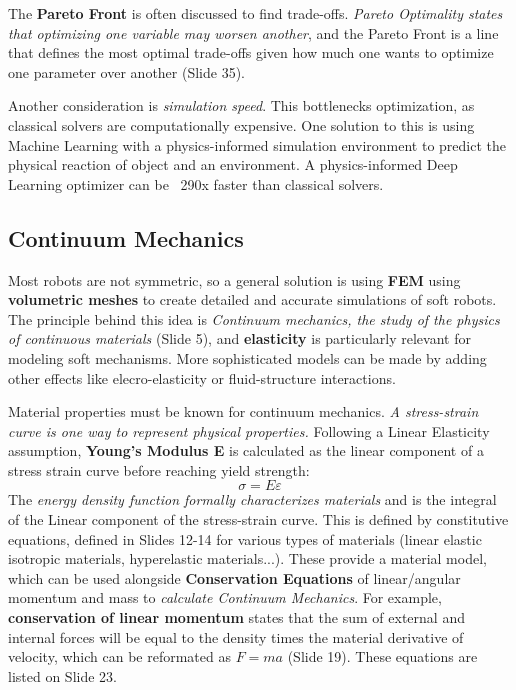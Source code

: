 \documentclass[onecolumn,a4paper]{article}
\begin{document}
The \textbf{Pareto Front} is often discussed to find trade-offs. \emph{Pareto Optimality states that optimizing one variable may worsen another}, and the Pareto Front is a line that defines the most optimal trade-offs given how much one wants to optimize one parameter over another (Slide 35).

Another consideration is \emph{simulation speed}. This bottlenecks optimization, as classical solvers are computationally expensive. One solution to this is using Machine Learning with a physics-informed simulation environment to predict the physical reaction of object and an environment. A physics-informed Deep Learning optimizer can be ~290x faster than classical solvers.

\subsection{Continuum Mechanics}

Most robots are not symmetric, so a general solution is using \textbf{FEM} using \textbf{volumetric meshes} to create detailed and accurate simulations of soft robots. The principle behind this idea is \emph{Continuum mechanics, the study of the physics of continuous materials} (Slide 5), and \textbf{elasticity} is particularly relevant for modeling soft mechanisms. More sophisticated models can be made by adding other effects like elecro-elasticity or fluid-structure interactions.

Material properties must be known for continuum mechanics. \emph{A stress-strain curve is one way to represent physical properties.} Following a Linear Elasticity assumption, \textbf{Young's Modulus E} is calculated as the linear component of a stress strain curve before reaching yield strength:
\begin{equation}
    \sigma=E\varepsilon
\end{equation}
 The \emph{energy density function formally characterizes materials} and is the integral of the Linear component of the stress-strain curve. This is defined by constitutive equations, defined in Slides 12-14 for various types of materials (linear elastic isotropic materials, hyperelastic materials...). These provide a material model, which can be used alongside \textbf{Conservation Equations} of linear/angular momentum and mass  to \emph{calculate Continuum Mechanics}. For example, \textbf{conservation of linear momentum} states that the sum of external and internal forces will be equal to the density times the material derivative of velocity, which can be reformated as $F=ma$ (Slide 19). These equations are listed on Slide 23.
\end{document}
